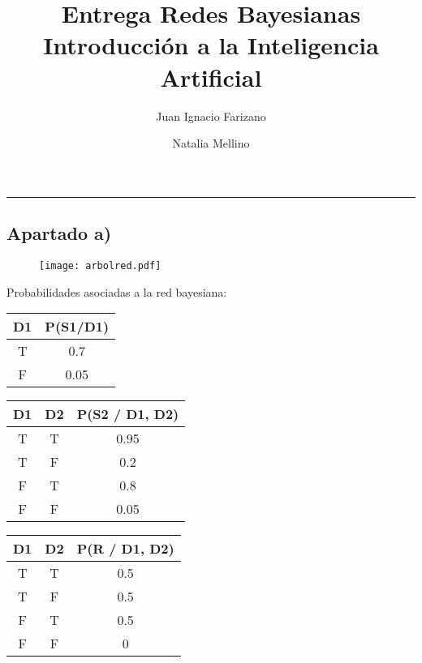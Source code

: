 \documentclass[11pt]{article}
\title{
    Entrega Redes Bayesianas \\
    \large Introducción a la Inteligencia Artificial}
\author{Juan Ignacio Farizano \and Natalia Mellino}
\date{}
\begin{document}
\maketitle
\noindent\rule{\textwidth}{1pt}

\subsection*{Apartado a)}

\begin{figure}[h!]
  \begin{center}
    \texttt{[image: arbolred.pdf]}
  \end{center}
\end{figure}

Probabilidades asociadas a la red bayesiana:

\begin{center}
  \begin{tabular}{| c | c |}
    \hline
    \textbf{D1} & \textbf{P(S1/D1)} \\ \hline
    T & 0.7 \\ \hline
    F & 0.05 \\ \hline    
  \end{tabular}
\end{center}


\begin{center}
  \begin{tabular}{| c | c | c |}
    \hline
    \textbf{D1} & \textbf{D2} & \textbf{P(S2 / D1, D2)} \\ \hline
    T & T & 0.95 \\ \hline
    T & F & 0.2 \\ \hline
    F & T & 0.8 \\ \hline
    F & F & 0.05 \\ \hline    
  \end{tabular}
\end{center}

\begin{center}
  \begin{tabular}{| c | c | c |}
    \hline
    \textbf{D1} & \textbf{D2} & \textbf{P(R / D1, D2)} \\ \hline
    T & T & 0.5 \\ \hline
    T & F & 0.5 \\ \hline
    F & T & 0.5 \\ \hline
    F & F & 0 \\ \hline    
  \end{tabular}
\end{center}
\end{document}
